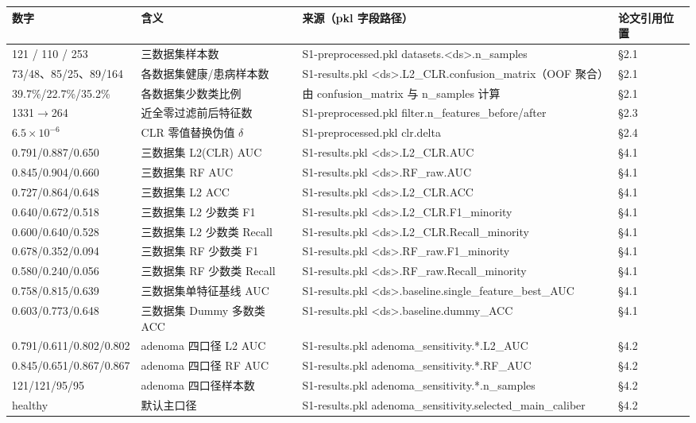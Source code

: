 \documentclass{article}
\begin{document}
\begin{center}
\footnotesize
\begin{tabular}{llll}
\toprule
数字 & 含义 & 来源（pkl 字段路径） & 论文引用位置 \\
\midrule
121 / 110 / 253 & 三数据集样本数 & S1-preprocessed.pkl datasets.<ds>.n\_samples & §2.1 \\
73/48、85/25、89/164 & 各数据集健康/患病样本数 & S1-results.pkl <ds>.L2\_CLR.confusion\_matrix（OOF 聚合） & §2.1 \\
39.7\%/22.7\%/35.2\% & 各数据集少数类比例 & 由 confusion\_matrix 与 n\_samples 计算 & §2.1 \\
1331$\to$264 & 近全零过滤前后特征数 & S1-preprocessed.pkl filter.n\_features\_before/after & §2.3 \\
$6.5\times10^{-6}$ & CLR 零值替换伪值 $\delta$ & S1-preprocessed.pkl clr.delta & §2.4 \\
0.791/0.887/0.650 & 三数据集 L2(CLR) AUC & S1-results.pkl <ds>.L2\_CLR.AUC & §4.1 \\
0.845/0.904/0.660 & 三数据集 RF AUC & S1-results.pkl <ds>.RF\_raw.AUC & §4.1 \\
0.727/0.864/0.648 & 三数据集 L2 ACC & S1-results.pkl <ds>.L2\_CLR.ACC & §4.1 \\
0.640/0.672/0.518 & 三数据集 L2 少数类 F1 & S1-results.pkl <ds>.L2\_CLR.F1\_minority & §4.1 \\
0.600/0.640/0.528 & 三数据集 L2 少数类 Recall & S1-results.pkl <ds>.L2\_CLR.Recall\_minority & §4.1 \\
0.678/0.352/0.094 & 三数据集 RF 少数类 F1 & S1-results.pkl <ds>.RF\_raw.F1\_minority & §4.1 \\
0.580/0.240/0.056 & 三数据集 RF 少数类 Recall & S1-results.pkl <ds>.RF\_raw.Recall\_minority & §4.1 \\
0.758/0.815/0.639 & 三数据集单特征基线 AUC & S1-results.pkl <ds>.baseline.single\_feature\_best\_AUC & §4.1 \\
0.603/0.773/0.648 & 三数据集 Dummy 多数类 ACC & S1-results.pkl <ds>.baseline.dummy\_ACC & §4.1 \\
0.791/0.611/0.802/0.802 & adenoma 四口径 L2 AUC & S1-results.pkl adenoma\_sensitivity.*.L2\_AUC & §4.2 \\
0.845/0.651/0.867/0.867 & adenoma 四口径 RF AUC & S1-results.pkl adenoma\_sensitivity.*.RF\_AUC & §4.2 \\
121/121/95/95 & adenoma 四口径样本数 & S1-results.pkl adenoma\_sensitivity.*.n\_samples & §4.2 \\
healthy & 默认主口径 & S1-results.pkl adenoma\_sensitivity.selected\_main\_caliber & §4.2 \\

\end{tabular}
\end{center}
\end{document}
